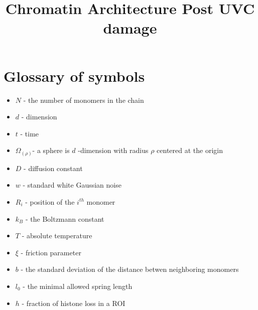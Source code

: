 \documentclass[12pt]{report}
\begin{document}
	
	\title{Chromatin Architecture Post UVC damage}
	\maketitle
	\tableofcontents
	\section{Glossary of symbols}
	\begin{itemize}
		\itemsep0em
		\item $N$ - the number of monomers in the chain
		\item $d$ - dimension 
		\item $t$ - time
		\item $\Omega_(\rho)$- a sphere is $d$ -dimension with radius $\rho$ centered at the origin
		\item $D$   - diffusion constant
		\item $w$   - standard white Gaussian noise
		\item $R_i$ - position of the $i^{th}$ monomer
		\item $k_B$ - the Boltzmann constant
		\item $T$   - absolute temperature
		\item $\xi$ - friction parameter
		\item $b$   - the standard deviation of the distance betwen neighboring monomers
		\item $l_0$ - the minimal allowed spring length
		\item $h$ - fraction of histone loss in a ROI
		
		
	\end{itemize}
\end{document}
